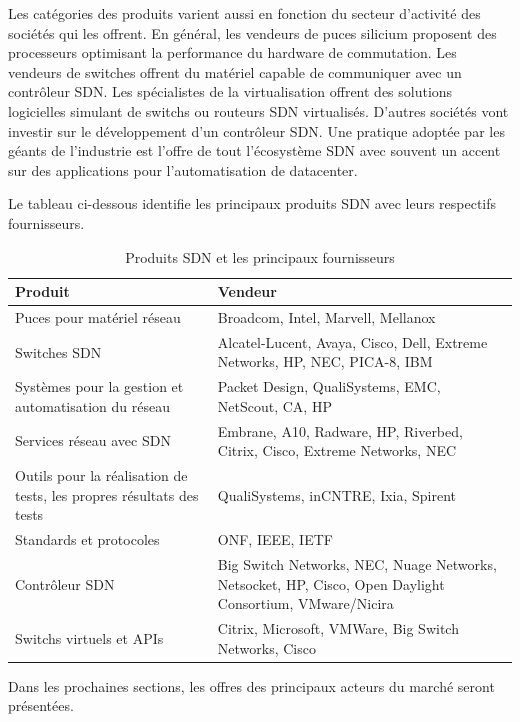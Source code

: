 Les catégories des produits varient aussi en fonction du secteur d'activité des sociétés qui les offrent. En général, les vendeurs de puces silicium proposent des processeurs optimisant la performance du hardware de commutation.  Les vendeurs de switches offrent du matériel capable de communiquer avec un contrôleur SDN. Les spécialistes de la \gls{virtualisation} offrent des solutions logicielles simulant de switchs ou routeurs SDN virtualisés. D'autres sociétés vont investir sur le développement d'un contrôleur SDN. Une pratique adoptée par les géants de l'industrie est l'offre de tout l'écosystème SDN avec souvent un accent sur des applications pour l'automatisation de \gls{datacenter}.\cite{2013GuideSDNNVEcosystem} 
 
 
Le tableau ci-dessous identifie les principaux produits SDN avec leurs respectifs fournisseurs.

\begin{table}[!h]
\centering
\begin{tabular}{|p{6cm}|p{9cm}|}
\hline 
\bf Produit & \bf Vendeur \\ 
\hline 
Puces pour matériel réseau & Broadcom, Intel, Marvell, Mellanox \\ 
\hline 
Switches SDN & Alcatel-Lucent, Avaya, Cisco, Dell, Extreme Networks, HP, NEC, PICA-8, IBM \\ 
\hline 
Systèmes pour la gestion et automatisation du réseau & Packet Design, QualiSystems, EMC, NetScout, CA, HP \\ 
\hline 
Services réseau avec SDN & Embrane, A10, Radware, HP, Riverbed, Citrix, Cisco,  Extreme Networks, NEC \\ 
\hline 
Outils pour la réalisation de tests, les propres résultats des tests & QualiSystems, inCNTRE, Ixia, Spirent \\ 
\hline 
Standards et protocoles & ONF, IEEE, IETF \\ 
\hline 
Contrôleur SDN & Big Switch Networks, NEC, Nuage Networks, Netsocket, HP, Cisco, Open Daylight Consortium, VMware/Nicira \\ 
\hline 
Switchs virtuels et APIs & Citrix, Microsoft, VMWare, Big Switch Networks, Cisco \\ 
\hline 
\end{tabular} 
\caption{Produits SDN et les principaux fournisseurs \cite{2013GuideSDNNVEcosystem}}
\end{table} 
 
Dans les prochaines sections, les offres des principaux acteurs du marché seront présentées.

